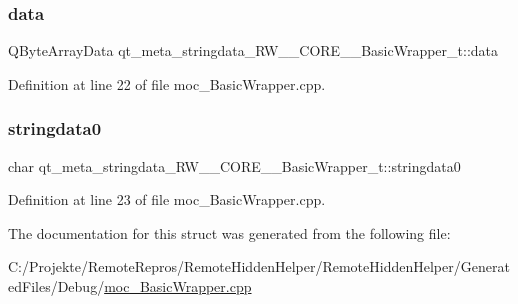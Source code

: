 \subsubsection{\texorpdfstring{data}{data}}
{\footnotesize\ttfamily Q\+Byte\+Array\+Data qt\+\_\+meta\+\_\+stringdata\+\_\+\+R\+W\+\_\+\+\_\+\+C\+O\+R\+E\+\_\+\+\_\+\+Basic\+Wrapper\+\_\+t\+::data}



Definition at line 22 of file moc\+\_\+\+Basic\+Wrapper.\+cpp.

\hypertarget{structqt__meta__stringdata___r_w_____c_o_r_e_____basic_wrapper__t_acfd3e55939192d866ddb55558956a9c6}{}\label{structqt__meta__stringdata___r_w_____c_o_r_e_____basic_wrapper__t_acfd3e55939192d866ddb55558956a9c6} 
\subsubsection{\texorpdfstring{stringdata0}{stringdata0}}
{\footnotesize\ttfamily char qt\+\_\+meta\+\_\+stringdata\+\_\+\+R\+W\+\_\+\+\_\+\+C\+O\+R\+E\+\_\+\+\_\+\+Basic\+Wrapper\+\_\+t\+::stringdata0}



Definition at line 23 of file moc\+\_\+\+Basic\+Wrapper.\+cpp.



The documentation for this struct was generated from the following file\+:\begin{DoxyCompactItemize}
\item 
C\+:/\+Projekte/\+Remote\+Repros/\+Remote\+Hidden\+Helper/\+Remote\+Hidden\+Helper/\+Generated\+Files/\+Debug/\hyperlink{_debug_2moc___basic_wrapper_8cpp}{moc\+\_\+\+Basic\+Wrapper.\+cpp}\end{DoxyCompactItemize}
